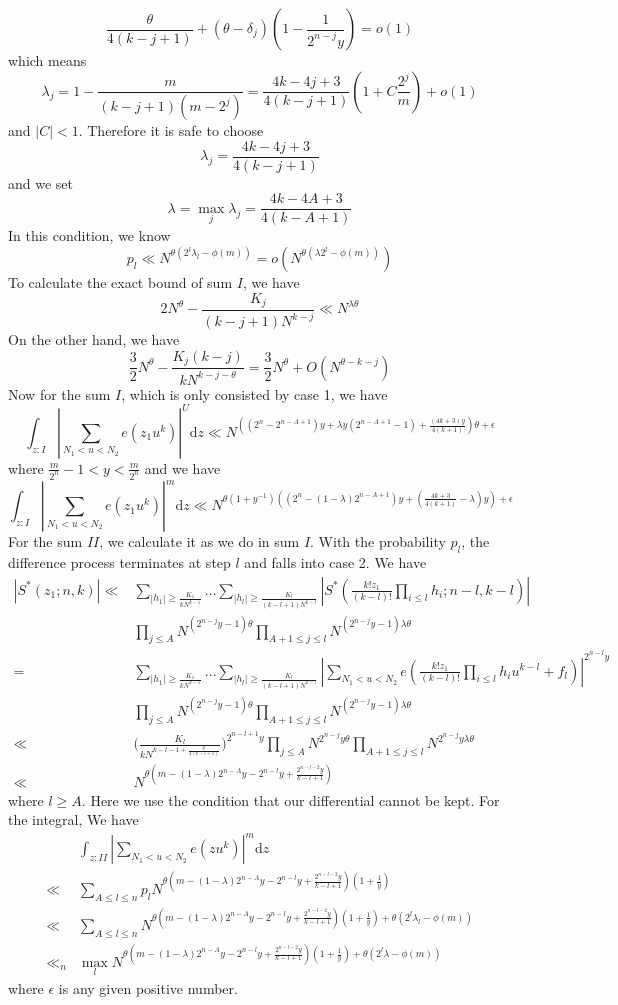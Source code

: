 \documentclass[10pt]{article}
\begin{document}
\[
\frac{\theta}{4(k-j+1)}+(\theta-\delta_j)(1-\frac{1}{2^{n-j}y})=o(1)
\]
which means
\[
\lambda_j=1-\frac{m}{(k-j+1)(m-2^j)}=\frac{4k-4j+3}{4(k-j+1)}(1+C\frac{2^j}{m})+o(1)
\]
and $|C|<1$. Therefore it is safe to choose
\[
\lambda_j=\frac{4k-4j+3}{4(k-j+1)}
\]
and we set
\[
\lambda=\max\limits_{j}\lambda_j=\frac{4k-4A+3}{4(k-A+1)}
\]
In this condition, we know
\[
p_l\ll N^{\theta(2^l\lambda_l-\phi(m))}=o(N^{\theta(\lambda2^l-\phi(m))})
\]
To calculate the exact bound of sum $I$, we have
\[
2N^{\theta}-\frac{K_j}{(k-j+1)N^{k-j}}\ll N^{\lambda\theta}
\]
On the other hand, we have
\[
\frac{3}{2}N^{\theta}-\frac{K_j(k-j)}{kN^{k-j-\theta}}=\frac{3}{2}N^{\theta}+O(N^{\theta-k-j})
\]
Now for the sum $I$, which is only consisted by case 1, we have
\[
\int_{z:I}|\sum\limits_{{N_1}<u<{N_2}}{e(z_1u^k)}|^{U}\mathrm{d}z\ll N^{((2^n-2^{n-A+1})y+\lambda y(2^{n-A+1}-1)+\frac{(4k+3)y}{4(k+1)})\theta+\epsilon}
\]
where $\frac{m}{2^n}-1<y<\frac{m}{2^n}$ and we have
\[
\int_{z:I}|\sum\limits_{{N_1}<u<{N_2}}{e(z_1u^k)}|^{m}\mathrm{d}z\ll N^{\theta(1+y^{-1})((2^n-(1-\lambda)2^{n-A+1})y+(\frac{4k+3}{4(k+1)}-\lambda)y)+\epsilon}
\]
For the sum $II$, we calculate it as we do in sum $I$. With the probability $p_l$, the difference process terminates at step $l$ and falls into case 2. We have
\begin{align*}
|S^*(z_1;n,k)|\ll&\sum\limits_{|h_1|\geq\frac{K_1}{kN^{k-1}}}...\sum\limits_{|h_l|\geq\frac{K_l}{(k-l+1)N^{k-l}}}|S^*(\frac{k!z_1}{(k-l)!}\prod\limits_{i\leq l}h_i;n-l,k-l)|\\
&\prod\limits_{j\leq A}N^{(2^{n-j}y-1)\theta}\prod\limits_{A+1\leq j\leq l}N^{(2^{n-j}y-1)\lambda\theta}\\
=&\sum\limits_{|h_1|\geq\frac{K_1}{kN^{k-1}}}...\sum\limits_{|h_l|\geq\frac{K_l}{(k-l+1)N^{k-l}}}|\sum\limits_{{N_1}<u<{N_2}}{e(\frac{k!z_1}{(k-l)!}\prod\limits_{i\leq l}h_iu^{k-l}+f_l)}|^{2^{n-l}y}\\
&\prod\limits_{j\leq A}N^{(2^{n-j}y-1)\theta}\prod\limits_{A+1\leq j\leq l}N^{(2^{n-j}y-1)\lambda\theta}\\
\ll&\bigg(\frac{K_l}{kN^{k-l-1+\frac{\theta}{4(k-l+1)}}}\bigg)^{2^{n-l+1}y}\prod\limits_{j\leq A}N^{2^{n-j}y\theta}\prod\limits_{A+1\leq j\leq l}N^{2^{n-j}y\lambda\theta}\\
\ll&N^{\theta(m-(1-\lambda)2^{n-A}y-2^{n-l}y+\frac{2^{n-l-2}y}{k-l+1})}
\end{align*}
where $l\geq A$. Here we use the condition that our differential cannot be kept. For the integral, We have 
\begin{align*}
&\int_{z:II}|\sum\limits_{{N_1}<u<{N_2}}{e(zu^k)}|^{m}\mathrm{d}z\\
\ll&\sum\limits_{A\leq l\leq n}p_lN^{\theta(m-(1-\lambda)2^{n-A}y-2^{n-l}y+\frac{2^{n-l-2}y}{k-l+1})(1+\frac{1}{y})}\\
\ll&\sum\limits_{A\leq l\leq n}N^{\theta(m-(1-\lambda)2^{n-A}y-2^{n-l}y+\frac{2^{n-l-2}y}{k-l+1})(1+\frac{1}{y})+\theta(2^l\lambda_l-\phi(m))}\\
\ll_n&\max\limits_lN^{\theta(m-(1-\lambda)2^{n-A}y-2^{n-l}y+\frac{2^{n-l-2}y}{k-l+1})(1+\frac{1}{y})+\theta(2^l\lambda-\phi(m))}
\end{align*}
where $\epsilon$ is any given positive number.
\end{document}

